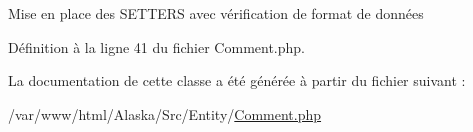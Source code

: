 Mise en place des S\+E\+T\+T\+E\+RS avec vérification de format de données 

Définition à la ligne 41 du fichier Comment.\+php.



La documentation de cette classe a été générée à partir du fichier suivant \+:\begin{DoxyCompactItemize}
\item 
/var/www/html/\+Alaska/\+Src/\+Entity/\hyperlink{_comment_8php}{Comment.\+php}\end{DoxyCompactItemize}
